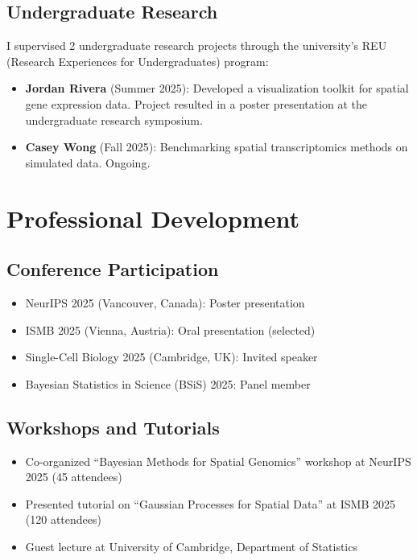 \documentclass[
    language=english,
    doctype=postdoc-report,
    institution=none,
]{../../omnilatex}
\begin{document}
\subsection{Undergraduate Research}

I supervised 2 undergraduate research projects through the university's
REU (Research Experiences for Undergraduates) program:

\begin{itemize}
    \item \textbf{Jordan Rivera} (Summer 2025): Developed a visualization
          toolkit for spatial gene expression data. Project resulted in
          a poster presentation at the undergraduate research symposium.
    \item \textbf{Casey Wong} (Fall 2025): Benchmarking spatial
          transcriptomics methods on simulated data. Ongoing.
\end{itemize}

\section{Professional Development}
\label{sec:development}

\subsection{Conference Participation}

\begin{itemize}
    \item NeurIPS 2025 (Vancouver, Canada): Poster presentation
    \item ISMB 2025 (Vienna, Austria): Oral presentation (selected)
    \item Single-Cell Biology 2025 (Cambridge, UK): Invited speaker
    \item Bayesian Statistics in Science (BSiS) 2025: Panel member
\end{itemize}

\subsection{Workshops and Tutorials}

\begin{itemize}
    \item Co-organized ``Bayesian Methods for Spatial Genomics'' workshop
          at NeurIPS 2025 (45 attendees)
    \item Presented tutorial on ``Gaussian Processes for Spatial Data''
          at ISMB 2025 (120 attendees)
    \item Guest lecture at University of Cambridge, Department of Statistics
\end{itemize}
\end{document}
